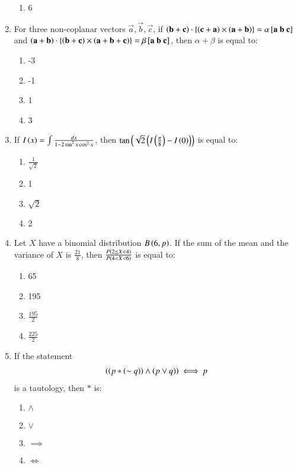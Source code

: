 \documentclass[journal]{IEEEtran}
\begin{document}
\begin{enumerate}
\begin{enumerate}
    \item 6 \\
\end{enumerate}
\item For three non-coplanar vectors $\vec{a}, \vec{b}, \vec{c}$, if $\left(\mathbf{b}+\mathbf{c}\right)\cdot\left\{\left(\mathbf{c}+\mathbf{a}\right)\times\left(\mathbf{a}+\mathbf{b}\right)\right\} = \alpha{}\left[\mathbf{a}\ \mathbf{b}\ \mathbf{c}\right]$ and $\left(\mathbf{a}+\mathbf{b}\right)\cdot\left\{\left(\mathbf{b}+\mathbf{c}\right)\times\left(\mathbf{a}+\mathbf{b}+\mathbf{c}\right)\right\} = \beta{}\left[\mathbf{a}\ \mathbf{b}\ \mathbf{c}\right]$, then $\alpha+\beta$ is equal to:
\begin{enumerate}
    \item -3
    \item -1
    \item 1
    \item 3 \\
\end{enumerate}
\item If $I\left(x\right) = \int \frac{dx}{1 - 2\sin^2x\cos^2x}$, then $\tan\left(\sqrt{2}\left(I\left(\frac{\pi}{8}\right) - I\left(0\right)\right)\right)$ is equal to:
\begin{enumerate}
    \item $\frac{1}{\sqrt{2}}$
    \item 1
    \item $\sqrt{2}$
    \item 2 \\
\end{enumerate}
\item Let $X$ have a binomial distribution $B\left(6,p\right)$. If the sum of the mean and the variance of $X$ is $\frac{21}{8}$, then $\frac{P\left(2 \leq X < 4\right)}{P\left(4 < X < 6\right)}$ is equal to:
\begin{enumerate}
   \item 65
   \item 195
   \item $\frac{195}{2}$
   \item $\frac{225}{2}$ \\
\end{enumerate}
\item If the statement 
\begin{align*}
    \left(\left(p*\left(\sim q\right)\right)\land\left(p \lor q\right)\right) \iff p
\end{align*}
is a tautology, then $*$ is:
\begin{enumerate}
    \item $\land$
    \item $\lor$
    \item $\implies$
    \item $\iff$ \\
\end{enumerate}
			 \end{enumerate}
			 
\end{document}
